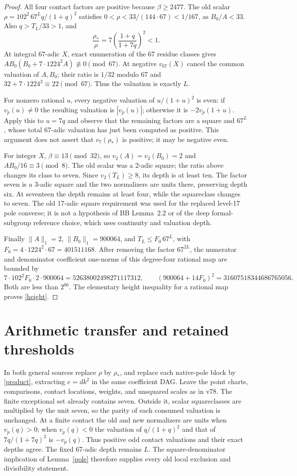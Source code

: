 \documentclass[11pt]{article}
\begin{document}
\begin{proof}
All four contact factors are positive because $\beta\ge2477$.
The old scalar $\rho=102^2\,67^Lq/(1+q)^2$ satisfies
$0<\rho<33/(144\cdot67)<1/167$, as $B_0/A<33$.
Also $q>T_L/33>1$, and
\[
 \frac{\rho_*}{\rho}=7\left(\frac{1+q}{1+7q}\right)^2<1.
\]
At integral 67-adic $X$, exact enumeration of the 67 residue classes
gives $AB_0(B_0+7\cdot1224^2A)\not\equiv0\pmod {67}$.
At negative $v_{67}(X)$ cancel the common valuation of $A,B_0$;
their ratio is $1/32$ modulo 67 and
$32+7\cdot1224^2\equiv22\pmod {67}$. Thus the valuation is exactly $L$.

For nonzero rational $u$, every negative valuation of $u/(1+u)^2$
is even: if $v_p(u)\ne0$ the resulting valuation is $|v_p(u)|$;
otherwise it is $-2v_p(1+u)$. Apply this to $u=7q$ and observe
that the remaining factors are a square and $67^L$, whose total
67-adic valuation has just been computed as positive. This argument
does not assert that $v_7(\rho_*)$ is positive; it may be negative even.

For integer $X$, $\beta\equiv13\pmod {32}$, so
$v_2(A)=v_2(B_0)=2$ and $AB_0/16\equiv3\pmod8$.
The old scalar was a 2-adic square; the ratio above changes its class
to seven. Since $v_2(T_L)\ge8$, its depth is at least ten.
The factor seven is a 3-adic square and the two normalizers are units
there, preserving depth six. At seventeen the depth remains at least
four, while the squareclass changes to seven. The old 17-adic square
requirement was used for the replaced level-17 pole converse; it is
not a hypothesis of BB Lemma~2.2 or of the deep formal-subgroup reference
choice, which uses continuity and valuation depth.

Finally $\|A\|_1=2$, $\|B_0\|_1=900064$, and
$T_L\le F_0\,67^L$, with $F_0=4\cdot1224^2\cdot67=401511168$.
After removing the factor $67^{2L}$, the numerator and denominator
coefficient one-norms of this degree-four rational map are bounded by
\[
 7\cdot102^2F_0\cdot2\cdot900064=52638002498271117312,
 \qquad(900064+14F_0)^2=31607518344686765056.
\]
Both are less than $2^{66}$. The elementary height inequality for a
rational map proves \eqref{height}.
\end{proof}

\section{Arithmetic transfer and retained thresholds}
In both general sources replace $\rho$ by $\rho_*$, and replace each
native-pole block by \eqref{product}, extracting $e=dk^2$ in the same
coefficient DAG. Leave the point charts, comparisons, contact locations,
weights, and unsquared scales as in v78. The finite exceptional set already
contains seven. Outside it, scalar squareclasses are multiplied by the
unit seven, so the parity of each consumed valuation is unchanged.
At a finite contact the old and new normalizers are units when $v_p(q)>0$;
when $v_p(q)<0$ the valuation of $q/(1+q)^2$ and that of
$7q/(1+7q)^2$ is $-v_p(q)$. Thus positive odd contact valuations and
their exact depths agree. The fixed 67-adic depth remains $L$.
The square-denominator implication of Lemma~\ref{pole} therefore supplies
every old local exclusion and divisibility statement.
\end{document}
